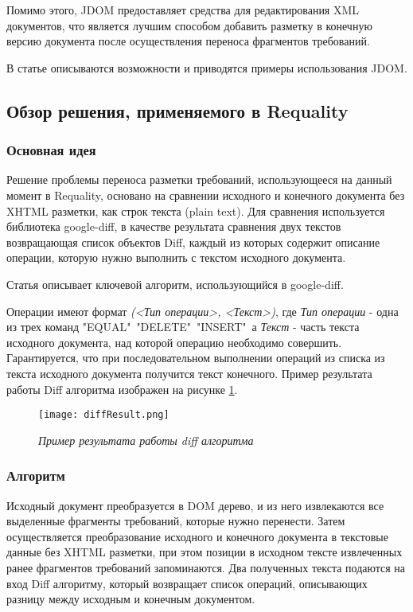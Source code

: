 Помимо этого, JDOM предоставляет средства для редактирования XML документов, что является лучшим способом добавить разметку в конечную версию документа после осуществления переноса  фрагментов требований.

В статье \cite{web:JDOM} описываются возможности и приводятся примеры использования JDOM.

\subsection{Обзор решения, применяемого в Requality}

\subsubsection{Основная идея}

Решение проблемы переноса разметки требований, использующееся на данный момент в Requality, основано на сравнении исходного и конечного документа без XHTML разметки, как строк текста (plain text). Для сравнения используется библиотека google-diff, в качестве результата сравнения двух текстов возвращающая список объектов Diff, каждый из которых содержит описание операции, которую нужно выполнить с текстом исходного документа.

Статья \cite{web:Diff} описывает ключевой алгоритм, использующийся в google-diff.

Операции имеют формат \emph{(<Тип операции>, <Текст>)}, где \emph{Тип операции} - одна из трех команд "EQUAL"\, "DELETE"\, "INSERT"\, а \emph{Текст} - часть текста исходного документа, над которой операцию необходимо совершить. Гарантируется, что при последовательном выполнении операций из списка из текста исходного документа получится текст конечного. Пример результата работы Diff алгоритма изображен на рисунке \ref{pr:image5}.

\begin{figure}[h]
\begin{center}
\texttt{[image: diffResult.png]}
\caption{\emph{Пример результата работы diff алгоритма}}
\label{pr:image5}
\end{center}
\end{figure}

\subsubsection{Алгоритм}

Исходный документ преобразуется в DOM дерево, и из него извлекаются все выделенные фрагменты требований, которые нужно перенести. Затем осуществляется преобразование исходного и конечного документа в текстовые данные без XHTML разметки, при этом позиции в исходном тексте извлеченных ранее фрагментов требований запоминаются. Два полученных текста подаются на вход Diff алгоритму, который возвращает список операций, описывающих разницу между исходным и конечным документом.

